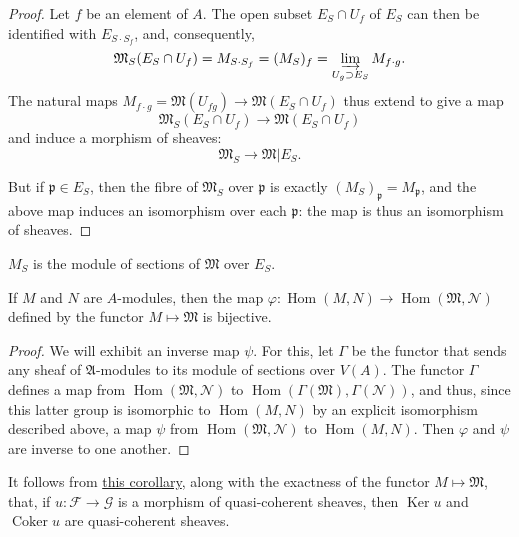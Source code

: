 \documentclass{article}
\theoremstyle{plain}
\newenvironment{corollary}[1]
    {\renewcommand\theinnercustomcorollary{#1}\innercustomcorollary}
    {\endinnercustomcorollary}
\newcommand{\sh}{\mathscr}
\DeclareMathOperator{\Hom}{Hom}
\DeclareMathOperator{\Ker}{Ker}
\DeclareMathOperator{\Coker}{Coker}
\newcommand{\oldpage}[1]{\marginpar{\footnotesize$\Big\vert$ \textit{p.~#1}}}
\begin{document}
\begin{proof}
  Let $f$ be an element of $A$.
  The open subset $E_S\cap U_f$ of $E_S$ can then be identified with $E_{S\cdot S_f}$, and, consequently,
  \[
    \mathfrak{M}_S(E_S\cap U_f)
    = M_{S\cdot S_f}
    = (M_S)_f
    = \varinjlim_{U_g\supset E_S}M_{f\cdot g}.
  \]
  The natural maps $M_{f\cdot g}=\mathfrak{M}(U_{fg})\to\mathfrak{M}(E_S\cap U_f)$ thus extend to give a map
  \[
    \mathfrak{M}_S(E_S\cap U_f) \to \mathfrak{M}(E_S\cap U_f)
  \]
  and induce a morphism of sheaves:
  \[
    \mathfrak{M}_S \to \mathfrak{M}|E_S.
  \]

  But if $\mathfrak{p}\in E_S$, then the fibre of $\mathfrak{M}_S$ over $\mathfrak{p}$ is exactly $(M_S)_\mathfrak{p}=M_\mathfrak{p}$, and the above map induces an isomorphism over each $\mathfrak{p}$:
  the map is thus an isomorphism of sheaves.
\end{proof}

\oldpage{1-07}
\begin{corollary}{2}
\label{corollary2}
  $M_S$ is the module of sections of $\mathfrak{M}$ over $E_S$.
\end{corollary}

\begin{corollary}{3}
\label{corollary3}
  If $M$ and $N$ are $A$-modules, then the map $\varphi\colon\Hom(M,N)\to\Hom(\mathfrak{M},\sh{N})$ defined by the functor $M\mapsto\mathfrak{M}$ is bijective.
\end{corollary}

\begin{proof}
  We will exhibit an inverse map $\psi$.
  For this, let $\Gamma$ be the functor that sends any sheaf of $\mathfrak{A}$-modules to its module of sections over $V(A)$.
  The functor $\Gamma$ defines a map from $\Hom(\mathfrak{M},\sh{N})$ to $\Hom(\Gamma(\mathfrak{M}),\Gamma(\sh{N}))$, and thus, since this latter group is isomorphic to $\Hom(M,N)$ by an explicit isomorphism described above, a map $\psi$ from $\Hom(\mathfrak{M},\sh{N})$ to $\Hom(M,N)$.
  Then $\varphi$ and $\psi$ are inverse to one another.
\end{proof}

It follows from \hyperref[corollary3]{this corollary}, along with the exactness of the functor $M\mapsto\mathfrak{M}$, that, if $u\colon\sh{F}\to\sh{G}$ is a morphism of quasi-coherent sheaves, then $\Ker u$ and $\Coker u$ are quasi-coherent sheaves.
\end{document}
